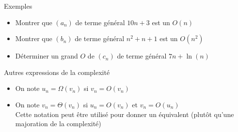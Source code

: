 \documentclass[10pt]{beamer}
\begin{document}
\begin{frame}[fragile]{\Ctitle}{\stitle}
    \begin{exampleblock}{Exemples}
        \begin{itemize}
            \item<1-> Montrer que $(a_n)$ de terme général $10n + 3$ est un $O(n)$\\
            \item<2-> Montrer que $(b_n)$ de terme général $n^2 + n + 1$ est un $O(n^2)$\\
            \item<3-> Déterminer un grand $O$ de $(c_n)$ de terme général $ 7 n + \ln(n)$\\
        \end{itemize}
    \end{exampleblock}
\end{frame}

\begin{frame}[fragile]{\Ctitle}{\stitle}
    \begin{block}{Autres expressions de la complexité}
        \begin{itemize}
            \item<1-> On note $u_n = \Omega(v_n)$ si $v_n = O(v_n)$ 
            \item<2-> On note $v_n = \Theta(v_n)$ si $u_n = O(v_n)$ et $v_n = O(u_n)$ \\
             Cette notation peut être utilisé pour donner un équivalent (plutôt qu'une majoration de la complexité)
        \end{itemize}
    \end{block}
\end{frame}
\end{document}
